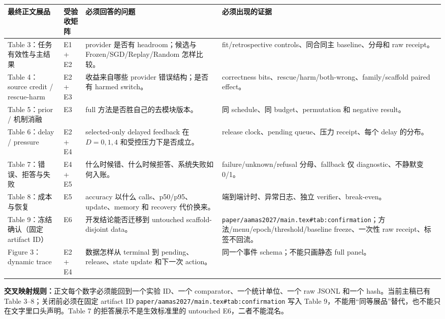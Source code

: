 \documentclass[10pt,letterpaper]{article}
\newcommand{\sect}[1]{\vspace{4pt}{\large\bfseries\color{GuideBlue}#1}\par\vspace{2pt}}
\newenvironment{clean}{\begin{center}\fontsize{8.55}{10.05}\selectfont\setlength{\tabcolsep}{3.7pt}\renewcommand{\arraystretch}{1.04}}{\end{center}}
\begin{document}
\newpage
\sect{6. 实验矩阵与正文交叉映射}
\begin{clean}
\begin{tabular}{@{}p{.12\linewidth}p{.19\linewidth}p{.29\linewidth}p{.27\linewidth}@{}}
\toprule
最终正文展品 & 受验收矩阵 & 必须回答的问题 & 必须出现的证据\\
\midrule
Table 3：任务有效性与主结果 & E1 + E2 & provider 是否有 headroom；候选与 Frozen/SGD/Replay/Random 怎样比较。 & fit/retrospective controls、同合同主 baseline、分母和 raw receipt。\\
Table 4：source credit / rescue-harm & E2 + E3 & 收益来自哪些 provider 错误结构；是否有 harmed switch。 & correctness bits、rescue/harm/both-wrong、family/scaffold paired effect。\\
Table 5：prior / 机制消融 & E3 & full 方法是否胜自己的去模块版本。 & 同 schedule、同 budget、permutation 和 negative result。\\
Table 6：delay / pressure & E2 + E4 & selected-only delayed feedback 在 $D=0,1,4$ 和受控压力下是否成立。 & release clock、pending queue、压力 receipt、每个 delay 的分布。\\
Table 7：错误、拒答与失败 & E4 + E5 & 什么时候错、什么时候拒答、系统失败如何入账。 & failure/unknown/refusal 分母、fallback 仅 diagnostic、不静默变 0/1。\\
Table 8：成本与恢复 & E5 & accuracy 以什么 calls、p50/p95、update、memory 和 recovery 代价换来。 & 端到端计时、异常日志、独立 verifier、break-even。\\
Table 9：冻结确认（固定 artifact ID） & E6 & 开发结论能否迁移到 untouched scaffold-disjoint data。 & \texttt{paper/}\allowbreak\texttt{aamas2027/}\allowbreak\texttt{main.tex}\allowbreak\texttt{\#tab:confirmation}；方法/\allowbreak menu/\allowbreak epoch/\allowbreak threshold/\allowbreak baseline freeze、一次性 raw receipt、标签不回流。\\
Figure 3：dynamic trace & E2 + E4 & 数据怎样从 terminal 到 pending、release、state update 和下一次 action。 & 同一个事件 schema；不能只画静态 full panel。\\
\bottomrule
\end{tabular}
\end{clean}
\textbf{交叉映射规则：}正文每个数字必须能回到一个实验 ID、一个 comparator、一个统计单位、一个 raw JSONL 和一个 hash。当前主稿已有 Table 3--8；关闭前必须在固定 artifact ID \texttt{paper/aamas2027/main.tex\#tab:confirmation} 写入 Table 9，不能用“同等展品”替代，也不能只在文字里口头声明。Table 7 的拒答展示不是生效标准里的 untouched E6，二者不能混名。
\end{document}
